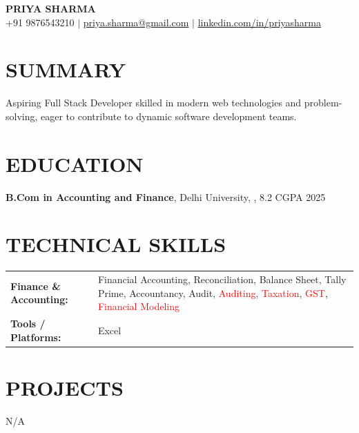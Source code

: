 \documentclass[8.5pt,a4paper]{extarticle}
\begin{document}
\begin{center}
{\large \textbf{PRIYA SHARMA}} \\ \vspace{1pt}
{\footnotesize +91 9876543210 \quad $|$ \quad \href{mailto:priya.sharma@gmail.com}{priya.sharma@gmail.com} \quad $|$ \quad \href{https://linkedin.com/in/priyasharma}{linkedin.com/in/priyasharma}}
\end{center}

\section*{SUMMARY}
{\small Aspiring Full Stack Developer skilled in modern web technologies and problem-solving, eager to contribute to dynamic software development teams.}

\section*{EDUCATION}
{\small \noindent \textbf{B.Com in Accounting and Finance}, Delhi University, , 8.2 CGPA \hfill 2025 \\ \vspace{4pt}

}
\section*{TECHNICAL SKILLS}
\small
\begin{tabular}{@{}p{2.2in}p{5.1in}@{}}
\textbf{Finance \& Accounting:} & Financial Accounting, Reconciliation, Balance Sheet, Tally Prime, Accountancy, Audit, \textcolor{red}{Auditing}, \textcolor{red}{Taxation}, \textcolor{red}{GST}, \textcolor{red}{Financial Modeling} \\
\textbf{Tools / Platforms:} & Excel \\
\end{tabular}



\section*{PROJECTS}
{\small N/A

}
\end{document}
